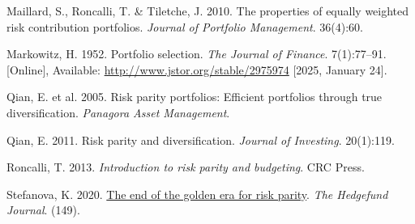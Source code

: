 \documentclass[11pt,preprint]{elsarticle}
\numberwithin{equation}{section}
\numberwithin{figure}{section}
\numberwithin{table}{section}
\newlength{\cslhangindent}
\newenvironment{CSLReferences}[2] %
{\begin{list}{}{%
	\setlength{\itemindent}{0pt}
	\setlength{\leftmargin}{0pt}
	\setlength{\parsep}{0pt}
	\ifodd #1
	\setlength{\leftmargin}{\cslhangindent}
	\setlength{\itemindent}{-1\cslhangindent}
	\fi
	\setlength{\itemsep}{#2\baselineskip}}}
{\end{list}}
\begin{document}
\begin{CSLReferences}{1}{1}
Maillard, S., Roncalli, T. \& Tiletche, J. 2010. The properties of
equally weighted risk contribution portfolios. \emph{Journal of
Portfolio Management}. 36(4):60.

Markowitz, H. 1952. Portfolio selection. \emph{The Journal of Finance}.
7(1):77--91. {[}Online{]}, Available:
\url{http://www.jstor.org/stable/2975974} {[}2025, January 24{]}.

Qian, E. et al. 2005. Risk parity portfolios: Efficient portfolios
through true diversification. \emph{Panagora Asset Management}.

Qian, E. 2011. Risk parity and diversification. \emph{Journal of
Investing}. 20(1):119.

Roncalli, T. 2013. \emph{Introduction to risk parity and budgeting}. CRC
Press.

Stefanova, K. 2020. \href{}{{The end of the golden era for risk
parity}}. \emph{The Hedgefund Journal}. (149).

\end{CSLReferences}


\end{document}

